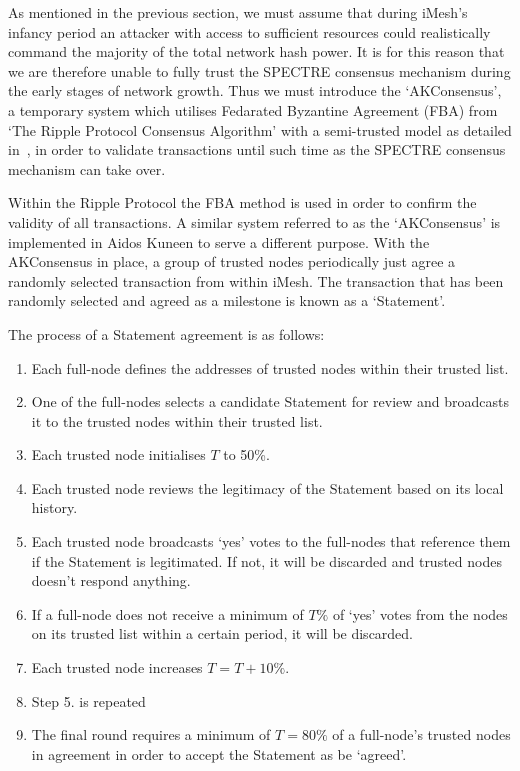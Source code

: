\documentclass[a4paper,10pt,twocolumn]{article}
\begin{document}
As mentioned in the previous section, we must assume that during iMesh's infancy period an attacker with access to sufficient resources 
could realistically command the majority of the total network hash power. It is for this reason that we are therefore unable to fully 
trust the SPECTRE consensus mechanism during the early stages of network growth. Thus we must introduce the `AKConsensus',
a temporary system which utilises Fedarated Byzantine Agreement (FBA) from `The Ripple Protocol Consensus Algorithm' 
with a semi-trusted model as detailed in~\cite{ripple},
 in order to validate transactions until  such time as the SPECTRE consensus mechanism can take over.

Within the Ripple Protocol the FBA method is used in order to confirm the validity of all transactions.
 A similar system referred to as the `AKConsensus' is implemented in Aidos Kuneen to serve a different purpose.
With the AKConsensus in place, a group of trusted nodes periodically just agree a randomly selected transaction from within iMesh.
The transaction that has been randomly selected and agreed as a milestone is known as a `Statement'. 

The process of  a Statement agreement is as follows:

\vspace{-0.5\baselineskip}
\begin{enumerate}
	\setlength\itemsep{0em}
	\item Each full-node defines the addresses of trusted nodes within their trusted list.
	\item One of the full-nodes selects a candidate Statement for review and broadcasts it to the trusted nodes within their trusted list.
	\item Each trusted node initialises \(T\) to 50\%.
	\item Each trusted node reviews the legitimacy of the Statement based on its local history.
	\item Each trusted node broadcasts `yes' votes to the full-nodes that reference them if the Statement is legitimated.
	If not, it will be discarded and trusted nodes doesn't respond anything.
	\item If a full-node does not receive a minimum of \(T\%\) of `yes' votes from the nodes on its trusted list within a certain period,
	it will be discarded.
	\item Each trusted node increases \(T=T+10\%\).
	\item Step 5. is repeated
	\item The final round requires a minimum of \(T=80\%\) of a full-node's trusted nodes in agreement in order to accept the Statement as be `agreed'.
\end{enumerate}
\end{document}
